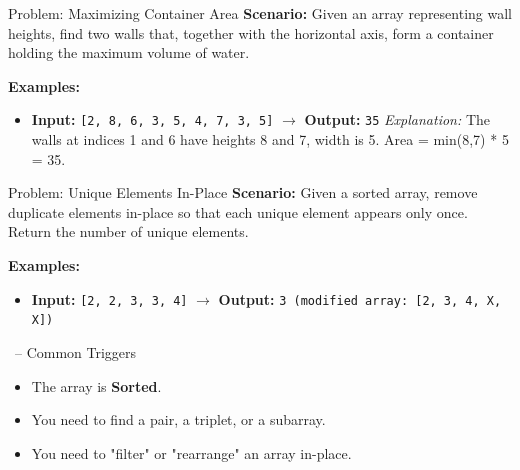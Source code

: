 \begin{frame}[fragile]{Problem: Maximizing Container Area}
  \textbf{Scenario:}
  Given an array representing wall heights, find two walls that, together with the horizontal axis, form a container holding the maximum volume of water.
  
  \vspace{0.3cm}
  \textbf{Examples:}
  \begin{itemize}
    \item \textbf{Input:} \texttt{[2, 8, 6, 3, 5, 4, 7, 3, 5]} $\rightarrow$ \textbf{Output:} \texttt{35}
    \newline \textit{Explanation:} The walls at indices 1 and 6 have heights 8 and 7, width is 5. Area = min(8,7) * 5 = 35.
  \end{itemize}
\end{frame}


\begin{frame}[fragile]{Problem: Unique Elements In-Place}
  \textbf{Scenario:}
  Given a sorted array, remove duplicate elements in-place so that each unique element appears only once. Return the number of unique elements.
  
  \vspace{0.3cm}
  \textbf{Examples:}
  \begin{itemize}
    \item \textbf{Input:} \texttt{[2, 2, 3, 3, 4]} $\rightarrow$ \textbf{Output:} \texttt{3 (modified array: [2, 3, 4, X, X])}
  \end{itemize}
\end{frame}

\begin{frame}{\secname\ -- Common Triggers}
  \begin{itemize}
    \item The array is \textbf{Sorted}.
        \item You need to find a pair, a triplet, or a subarray.
        \item You need to "filter" or "rearrange" an array in-place.
  \end{itemize}
\end{frame}
